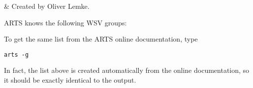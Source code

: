 \label{app:methods}


 & Created by Oliver Lemke. \\
\stophistory

ARTS knows the following WSV groups:


\noindent
To get the same list from the ARTS online documentation, type

\begin{verbatim}
arts -g
\end{verbatim}

\noindent
In fact, the list above is created automatically from the online
documentation, so it should be exactly identical to the
 output. 


